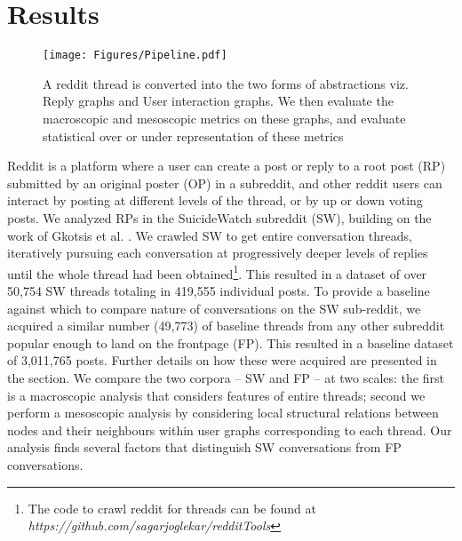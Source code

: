\vspace{-5mm}
\section{Results}
\begin{figure*}[!ht]
    \centering
    \texttt{[image: Figures/Pipeline.pdf]}
    \caption{A reddit thread is converted into the two forms of abstractions viz. Reply graphs and User interaction graphs. We then evaluate the macroscopic and mesoscopic metrics on these graphs, and evaluate statistical over or under representation of these metrics}
    \label{fig:pipeline}
\end{figure*}

Reddit is a platform where a user can create a post or reply to a root post (RP) submitted by an original poster (OP) in a subreddit, and other reddit users can interact by posting at different levels of the thread, or by up or down voting posts. We analyzed RPs in the SuicideWatch subreddit (SW), building on the work of Gkotsis et al. \cite{gkotsis2017characterisation}.
We crawled SW to get entire conversation threads,
iteratively pursuing each conversation at progressively deeper levels of replies until the whole thread had been obtained\footnote{The code to crawl reddit for threads can be found at \textit{https://github.com/sagarjoglekar/redditTools}}. This resulted in a dataset of over 50,754 SW threads totaling in 419,555 individual posts. 
To provide a baseline against which to compare nature of conversations on the SW sub-reddit, we acquired a similar number (49,773) of baseline threads from any other subreddit popular enough to land on the frontpage (FP). This resulted in a baseline dataset of 3,011,765 posts. Further details on how these were acquired are presented in the  section. We compare the two corpora -- SW and FP -- at two scales: the first is a macroscopic analysis that considers features of entire threads; second we perform a mesoscopic analysis by considering local structural relations between nodes and their neighbours within user graphs corresponding to each thread. Our analysis finds several factors that distinguish SW conversations from FP conversations. %

